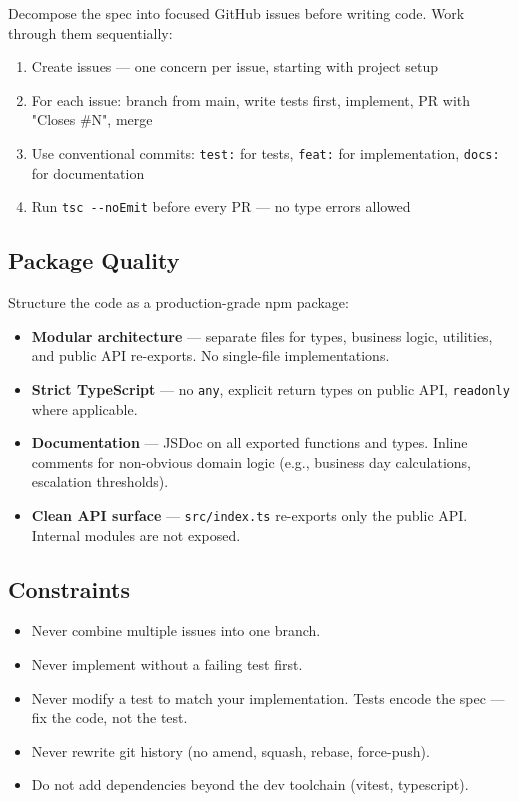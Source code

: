 Decompose the spec into focused GitHub issues before writing code. Work through them sequentially:

\begin{enumerate}
\def\labelenumi{\arabic{enumi}.}
\item
  Create issues --- one concern per issue, starting with project setup
\item
  For each issue: branch from main, write tests first, implement, PR with "Closes \#N", merge
\item
  Use conventional commits: \texttt{test:} for tests, \texttt{feat:} for implementation, \texttt{docs:} for documentation
\item
  Run \texttt{tsc\ -\/-noEmit} before every PR --- no type errors allowed
\end{enumerate}

\subsection{Package Quality}

Structure the code as a production-grade npm package:

\begin{itemize}
\item
  \textbf{Modular architecture} --- separate files for types, business logic, utilities, and public API re-exports. No single-file implementations.
\item
  \textbf{Strict TypeScript} --- no \texttt{any}, explicit return types on public API, \texttt{readonly} where applicable.
\item
  \textbf{Documentation} --- JSDoc on all exported functions and types. Inline comments for non-obvious domain logic (e.g., business day calculations, escalation thresholds).
\item
  \textbf{Clean API surface} --- \texttt{src/index.ts} re-exports only the public API. Internal modules are not exposed.
\end{itemize}

\subsection{Constraints}

\begin{itemize}
\item
  Never combine multiple issues into one branch.
\item
  Never implement without a failing test first.
\item
  Never modify a test to match your implementation. Tests encode the spec --- fix the code, not the test.
\item
  Never rewrite git history (no amend, squash, rebase, force-push).
\item
  Do not add dependencies beyond the dev toolchain (vitest, typescript).
\end{itemize}
